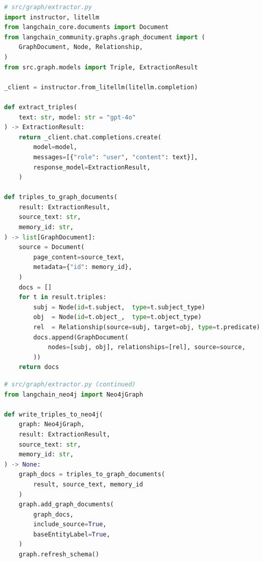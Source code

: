 \begin{lstlisting}[language=Python,
  caption={Triple extraction and GraphDocument conversion},
  label={lst:extractor}]
# src/graph/extractor.py
import instructor, litellm
from langchain_core.documents import Document
from langchain_community.graphs.graph_document import (
    GraphDocument, Node, Relationship,
)
from src.graph.models import Triple, ExtractionResult

_client = instructor.from_litellm(litellm.completion)

def extract_triples(
    text: str, model: str = "gpt-4o"
) -> ExtractionResult:
    return _client.chat.completions.create(
        model=model,
        messages=[{"role": "user", "content": text}],
        response_model=ExtractionResult,
    )

def triples_to_graph_documents(
    result: ExtractionResult,
    source_text: str,
    memory_id: str,
) -> list[GraphDocument]:
    source = Document(
        page_content=source_text,
        metadata={"id": memory_id},
    )
    docs = []
    for t in result.triples:
        subj = Node(id=t.subject,  type=t.subject_type)
        obj  = Node(id=t.object_,  type=t.object_type)
        rel  = Relationship(source=subj, target=obj, type=t.predicate)
        docs.append(GraphDocument(
            nodes=[subj, obj], relationships=[rel], source=source,
        ))
    return docs
\end{lstlisting}

\begin{lstlisting}[language=Python,
  caption={write\_triples\_to\_neo4j with deferred schema refresh},
  label={lst:write-triples}]
# src/graph/extractor.py (continued)
from langchain_neo4j import Neo4jGraph

def write_triples_to_neo4j(
    graph: Neo4jGraph,
    result: ExtractionResult,
    source_text: str,
    memory_id: str,
) -> None:
    graph_docs = triples_to_graph_documents(
        result, source_text, memory_id
    )
    graph.add_graph_documents(
        graph_docs,
        include_source=True,
        baseEntityLabel=True,
    )
    graph.refresh_schema()
\end{lstlisting}

